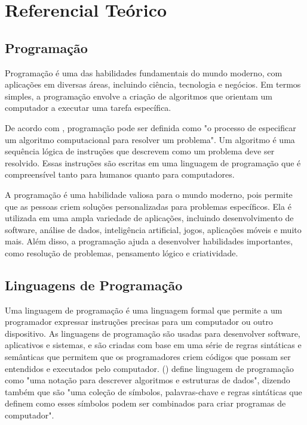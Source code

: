 \chapter[Referencial Teórico]{Referencial Teórico}

\section{Programação}

Programação é uma das habilidades fundamentais do mundo moderno, com aplicações em diversas áreas, incluindo ciência, tecnologia e negócios. Em termos simples, a programação envolve a criação de algoritmos que orientam um computador a executar uma tarefa específica.

De acordo com \cite{VanRoy2004}, programação pode ser definida como "o processo de especificar um algoritmo computacional para resolver um problema". Um algoritmo é uma sequência lógica de instruções que descrevem como um problema deve ser resolvido. Essas instruções são escritas em uma linguagem de programação que é compreensível tanto para humanos quanto para computadores.

A programação é uma habilidade valiosa para o mundo moderno, pois permite que as pessoas criem soluções personalizadas para problemas específicos. Ela é utilizada em uma ampla variedade de aplicações, incluindo desenvolvimento de software, análise de dados, inteligência artificial, jogos, aplicações móveis e muito mais. Além disso, a programação ajuda a desenvolver habilidades importantes, como resolução de problemas, pensamento lógico e criatividade.

\section{Linguagens de Programação}

Uma linguagem de programação é uma linguagem formal que permite a um programador expressar instruções precisas para um computador ou outro dispositivo. As linguagens de programação são usadas para desenvolver software, aplicativos e sistemas, e são criadas com base em uma série de regras sintáticas e semânticas que permitem que os programadores criem códigos que possam ser entendidos e executados pelo computador. \citeauthor{MichaelTGoodrich} (\citeyear{MichaelTGoodrich}) define linguagem de programação como "uma notação para descrever algoritmos e estruturas de dados", dizendo também que são "uma coleção de símbolos, palavras-chave e regras sintáticas que definem como esses símbolos podem ser combinados para criar programas de computador".

